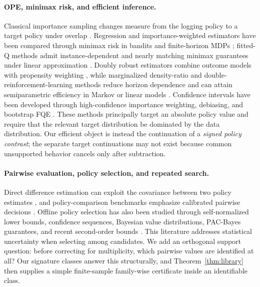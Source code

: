 \paragraph{OPE, minimax risk, and efficient inference.}
Classical importance sampling changes measure from the logging policy to a target policy under overlap \citep{precup2000eligibility}. Regression and importance-weighted estimators have been compared through minimax risk in bandits and finite-horizon MDPs \citep{li2015minimax}; fitted-Q methods admit instance-dependent and nearly matching minimax guarantees under linear approximation \citep{duan2020minimax}. Doubly robust estimators combine outcome models with propensity weighting \citep{dudik2011doubly,jiang2016doubly,thomas2016data}, while marginalized density-ratio and double-reinforcement-learning methods reduce horizon dependence and can attain semiparametric efficiency in Markov or linear models \citep{liu2018breaking,nachum2019dualdice,uehara2020minimax,kallus2020double,xie2023efficient}. Confidence intervals have been developed through high-confidence importance weighting, debiasing, and bootstrap FQE \citep{thomas2015high,shi2021deeply,hao2021bootstrap}. These methods principally target an absolute policy value and require that the relevant target distribution be dominated by the data distribution. Our efficient object is instead the continuation of a \emph{signed policy contrast}; the separate target continuations may not exist because common unsupported behavior cancels only after subtraction.

\paragraph{Pairwise evaluation, policy selection, and repeated search.}
Direct difference estimation can exploit the covariance between two policy estimates \citep{jeunen2024delta}, and policy-comparison benchmarks emphasize calibrated pairwise decisions \citep{koul2022offline}. Offline policy selection has also been studied through self-normalized lower bounds, confidence sequences, Bayesian value distributions, PAC-Bayes guarantees, and recent second-order bounds \citep{kuzborskij2021confident,karampatziakis2021confidence,yang2022selection,sakhi2023pac,ryu2025secondorder}. This literature addresses statistical uncertainty when selecting among candidates. We add an orthogonal support question: before correcting for multiplicity, which pairwise values are identified at all? Our signature classes answer this structurally, and Theorem~\ref{thm:library} then supplies a simple finite-sample family-wise certificate inside an identifiable class.

